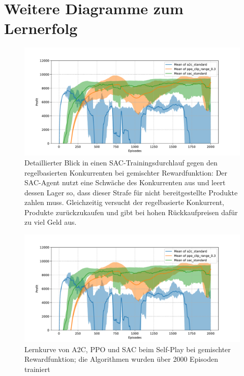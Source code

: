 \section{Weitere Diagramme zum Lernerfolg}
\begin{figure}[htbp]
	\centering
	\includegraphics[width=\textwidth]{appendix/self_play_mixed.pdf}
	\caption{
        Detaillierter Blick in einen SAC-Trainingsdurchlauf gegen den regelbasierten Konkurrenten bei gemischter Rewardfunktion:
        Der SAC-Agent nutzt eine Schwäche des Konkurrenten aus und leert dessen Lager so, dass dieser Strafe für nicht bereitgestellte Produkte zahlen muss.
        Gleichzeitig versucht der regelbasierte Konkurrent, Produkte zurückzukaufen und gibt bei hohen Rückkaufpreisen dafür zu viel Geld aus.
    }
	\label{grafic:ExplanationUnnormalSAC}
\end{figure}
\begin{figure}[htbp]
	\centering
	\includegraphics[width=\textwidth]{appendix/self_play_mixed.pdf}
	\caption{Lernkurve von A2C, PPO und SAC beim Self-Play bei gemischter Rewardfunktion; die Algorithmen wurden über 2000 Episoden trainiert}
	\label{grafic:SelfPlayMixedLearningCurve}
\end{figure}
